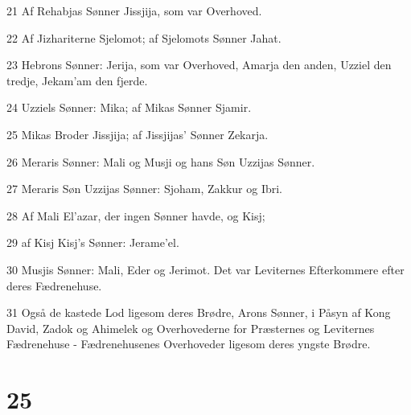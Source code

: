 \par 21 Af Rehabjas Sønner Jissjija, som var Overhoved.
\par 22 Af Jizhariterne Sjelomot; af Sjelomots Sønner Jahat.
\par 23 Hebrons Sønner: Jerija, som var Overhoved, Amarja den anden, Uzziel den tredje, Jekam'am den fjerde.
\par 24 Uzziels Sønner: Mika; af Mikas Sønner Sjamir.
\par 25 Mikas Broder Jissjija; af Jissjijas' Sønner Zekarja.
\par 26 Meraris Sønner: Mali og Musji og hans Søn Uzzijas Sønner.
\par 27 Meraris Søn Uzzijas Sønner: Sjoham, Zakkur og Ibri.
\par 28 Af Mali El'azar, der ingen Sønner havde, og Kisj;
\par 29 af Kisj Kisj's Sønner: Jerame'el.
\par 30 Musjis Sønner: Mali, Eder og Jerimot. Det var Leviternes Efterkommere efter deres Fædrenehuse.
\par 31 Også de kastede Lod ligesom deres Brødre, Arons Sønner, i Påsyn af Kong David, Zadok og Ahimelek og Overhovederne for Præsternes og Leviternes Fædrenehuse - Fædrenehusenes Overhoveder ligesom deres yngste Brødre.

\chapter{25}

